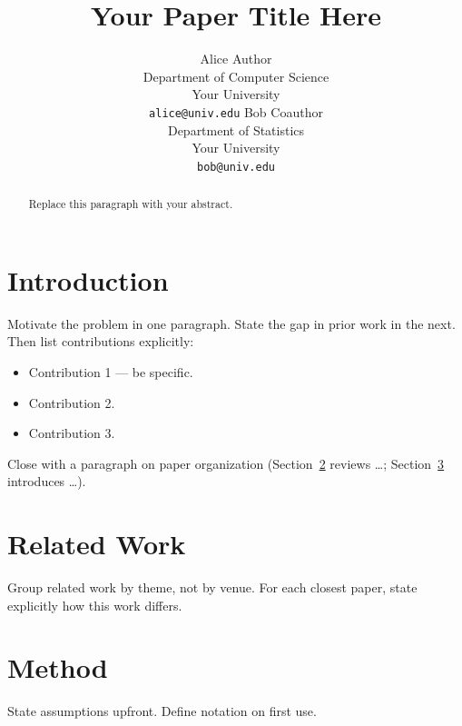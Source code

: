 \documentclass{article}
\title{Your Paper Title Here}
\author{
  Alice Author \\
  Department of Computer Science \\
  Your University \\
  \texttt{alice@univ.edu}
  \And
  Bob Coauthor \\
  Department of Statistics \\
  Your University \\
  \texttt{bob@univ.edu}
}
\begin{document}
\maketitle

\begin{abstract}
Replace this paragraph with your abstract.
\end{abstract}

\section{Introduction}
\label{sec:intro}

Motivate the problem in one paragraph. State the gap in prior work in the
next. Then list contributions explicitly:

\begin{itemize}
    \item Contribution 1 --- be specific.
    \item Contribution 2.
    \item Contribution 3.
\end{itemize}

Close with a paragraph on paper organization (Section~\ref{sec:related}
reviews \dots; Section~\ref{sec:method} introduces \dots).

\section{Related Work}
\label{sec:related}

Group related work by theme, not by venue. For each closest paper, state
explicitly how this work differs.

\section{Method}
\label{sec:method}

State assumptions upfront. Define notation on first use.

\end{document}
